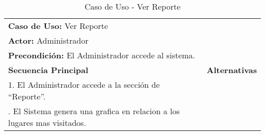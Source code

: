 \begin{table}[H]
  \begin{center}
    \begin{tabularx}{0.75\textwidth}{ X X  }
      \toprule
      \multicolumn{2}{l}{\textbf{Caso de Uso:} Ver Reporte} \\
      \multicolumn{2}{l}{\textbf{Actor:} Administrador} \\
      \multicolumn{2}{l}{\textbf{Precondición:} El Administrador accede al sistema.} \\
      \addlinespace
      \textbf{Secuencia Principal} & \textbf{Alternativas} \\
      \midrule
      1. El Administrador accede a la sección de ``Reporte''. \\
      \addlinespace
      2. El Sistema genera una grafica en relacion a los lugares mas visitados.  \\


      \bottomrule
    \end{tabularx}
    \caption{Caso de Uso - Ver Reporte}
    \label{tab:cu_ver_reporte}
  \end{center}
\end{table}
